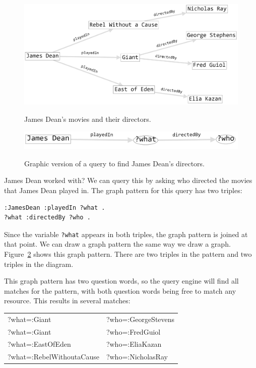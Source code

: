 \begin{figure}
\centering
\includegraphics[width=5in]{SWWOv3/media/ch6/figure6-2.png}
\label{fig:ch6.2}
\caption{James Dean's movies and their directors.}
\end{figure}

\begin{figure}
\centering
\includegraphics[width=5in]{SWWOv3/media/ch6/figure6-3.png}
\label{fig:ch6.3}
\caption{Graphic version of a query to find James Dean's directors.}
\end{figure}

James Dean worked with? We can query this by asking who directed the
movies that James Dean played in. The graph pattern for this query has
two triples:

\begin{lstlisting}
:JamesDean :playedIn ?what .
?what :directedBy ?who .
\end{lstlisting}

Since the variable \texttt{?what} appears in both triples, the graph pattern is
joined at that point. We can draw a graph pattern the same way we draw a
graph. Figure~\ref{fig:ch6.3} shows this graph pattern. There are two triples in the
pattern and two triples in the diagram.

This graph pattern has two question words, so the query engine will find
all matches for the pattern, with both question words being free to
match any resource. This results in several matches:

\begin{tabular}{ l l }
?what=:Giant&?who=:GeorgeStevens\\
?what=:Giant&?who=:FredGuiol \\
?what=:EastOfEden&?who=:EliaKazan \\
?what=:RebelWithoutaCause&?who=:NicholasRay \\
\end{tabular}

